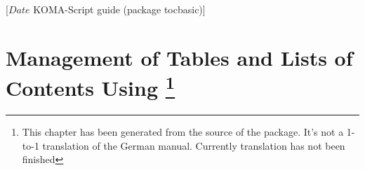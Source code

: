 %
%
%
%
%
%
%
%
% 
%
%
%
%

                 [$Date$
                  KOMA-Script guide (package tocbasic)]


\chapter[{Management of Tables and Lists of Contents Using
  \Package{tocbasic}}]
  {Management of Tables and Lists of Contents Using
  \protect\footnote{This chapter has been generated from the
 source of the package. It's not a 1-to-1 translation of the German
 manual. Currently translation has not been finished}}

